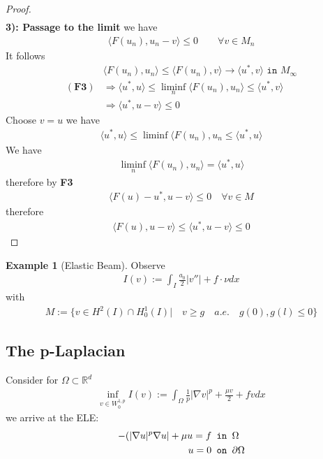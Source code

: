 \documentclass[a4paper,11pt,oneside,fleqn]{book}
\theoremstyle{definition}
\newtheorem*{example}{Example}
\theoremstyle{remark}
\let\div\relax
\DeclareMathOperator{\div}{div}
\begin{document}
\begin{proof}
\begin{align*}
	\end{align*}
	\textbf{3): Passage to the limit}
	we have
	\begin{align*}
		\langle F(u_n) , u_n - v \rangle \le 0  \qquad \forall v \in M_n
	\end{align*}
	It follows
	\begin{align*}
		&\langle F(u_n), u_n \rangle \le \langle F(u_n), v \rangle \rightarrow \langle u^*, v \rangle \texttt{ in } M_\infty\\
		(\textbf{F3})
		& \Rightarrow \langle u^*, u \rangle \le   \liminf_n \langle F(u_n), u_n \rangle \le \langle u^*, v \rangle\\
		&\Rightarrow \langle u^*, u - v \rangle \le 0
	\end{align*}
	Choose $v = u$ we have
	\begin{align*}
		\langle u^*, u \rangle \le  \liminf \langle F(u_n), u_n \le \langle u^*, u \rangle 
	\end{align*}
	We have
	\begin{align*}
		\liminf_n \langle F(u_n), u_n \rangle = \langle u^*, u \rangle
	\end{align*}
	therefore by \textbf{F3}
	\begin{align*}
		\langle F(u) - u^*, u - v \rangle \le 0 \quad \forall v \in M
	\end{align*}
	therefore
	\begin{align*}
		\langle F(u), u - v \rangle \le \langle u^*, u - v \rangle \le 0
	\end{align*}
\end{proof}

\begin{example}[Elastic Beam]
	Observe
	\begin{align*}
		I(v) := \int_I \frac{a_0}{2} |v''| + f \cdot \nu  dx 
	\end{align*}
	with 
	\begin{align*}
		M:= \{ v \in H^2(I) \cap H^1_0(I) | \quad v \ge g \quad a.e. \quad g(0), g(l) \le 0 \}
	\end{align*}
\end{example}


\subsection{The p-Laplacian}
Consider for $\Omega \subset \mathbb{R}^d$
\begin{align*}
	\inf_{v \in W^{1, p}_0}I(v):= \int_\Omega \frac{1}{p}|\nabla v |^p + \frac{\mu v }{2} + fv dx 
\end{align*}
we arrive at the ELE:
\begin{align*}
	-\div (|\nabla u |^p \nabla u | + \mu u = f &\texttt{ in } \Omega\\
	u = 0 &\texttt{ on } \partial\Omega
\end{align*}
\end{document}
